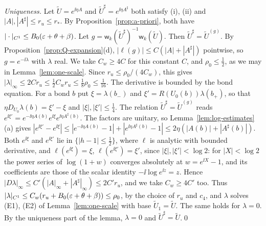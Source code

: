 \emph{Uniqueness.} Let $\tilde U=e^{\ii\eta A}$ and $\tilde U^\sharp=e^{\ii\eta A^\sharp}$ both satisfy (i), (ii) and $|A|,|A^\sharp|\le r_u\le r_*$. By Proposition~\ref{prop:a-priori}, both have $|\cdot|_{C^1}\le B_0(\varepsilon+\theta+\beta)$. Let $g=\mathsf w_k(\tilde U^\sharp)^{-1}\mathsf w_k(\tilde U)$. Then $\tilde U^\sharp=\tilde U^{(g)}$. By Proposition~\ref{prop:Q-expansion}(d), $|\ell(g)|\le C(|A|+|A^\sharp|)$ pointwise, so $g=e^{-\ii\lambda}$ with $\lambda$ real. We take $C_w\ge4C$ for this constant $C$, and $\rho_0\le\frac12$, as we may in Lemma~\ref{lem:one-scale}. Since $r_u\le\rho_0/(4C_w)$, this gives $|\lambda|_\infty\le2Cr_u\le\frac12C_wr_u\le\frac18\rho_0\le\frac1{16}$. The derivative is bounded by the bond equation. For a bond $b$ put $\xi=\lambda(b_-)$ and $\xi'=R(U_0(b))\lambda(b_+)$, so that $\eta D_{U_0}\lambda(b)=\xi'-\xi$ and $|\xi|,|\xi'|\le\frac14$. The relation $\tilde U^\sharp=\tilde U^{(g)}$ reads $e^{\ii\xi'}=e^{-\ii\eta A(b)}e^{\ii\xi}e^{\ii\eta A^\sharp(b)}$. The factors are unitary, so Lemma~\ref{lem:log-estimates}(a) gives $|e^{\ii\xi'}-e^{\ii\xi}|\le|e^{-\ii\eta A(b)}-1|+|e^{\ii\eta A^\sharp(b)}-1|\le2\eta(|A(b)|+|A^\sharp(b)|)$. Both $e^{\ii\xi}$ and $e^{\ii\xi'}$ lie in $\{|h-1|\le\frac12\}$, where $\ell$ is analytic with bounded derivative, and $\ell(e^{\ii\xi})=\xi$, $\ell(e^{\ii\xi'})=\xi'$, since $|\xi|,|\xi'|<\log2$: for $|X|<\log2$ the power series of $\log(1+w)$ converges absolutely at $w=e^{\ii X}-1$, and its coefficients are those of the scalar identity $-\ii\log e^{\ii z}=z$. Hence $|D\lambda|_\infty\le C'(|A|_\infty+|A^\sharp|_\infty)\le2C'r_u$, and we take $C_w\ge4C'$ too. Thus $|\lambda|_{C^1}\le C_w(r_u+B_0(\varepsilon+\theta+\beta))\le\rho_0$, by the choice of $r_u$ and $c_4$, and $\lambda$ solves (E1), (E2) of Lemma~\ref{lem:one-scale} with base $\tilde U_1=\tilde U$. The same holds for $\lambda=0$. By the uniqueness part of the lemma, $\lambda=0$ and $\tilde U^\sharp=\tilde U$.\qed
